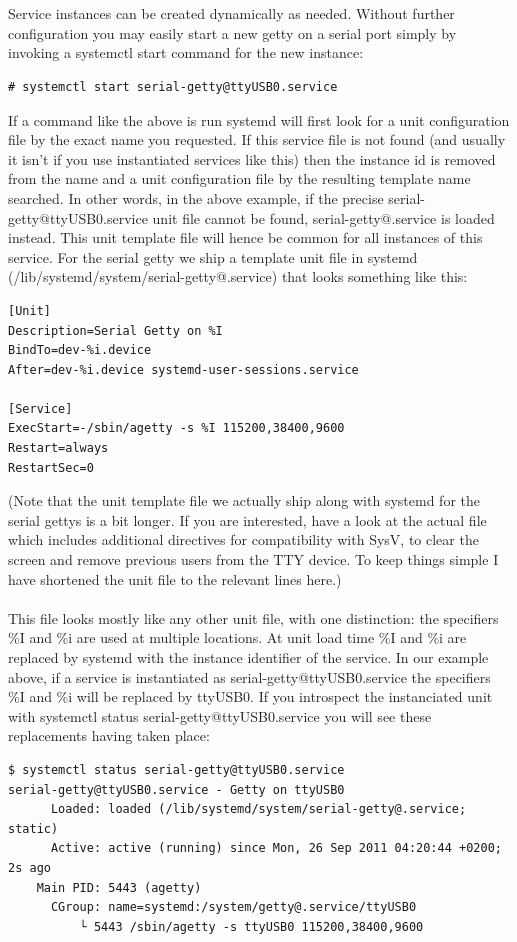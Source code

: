 \documentclass[titlepage]{article}
\begin{document}
\\
\\
Service instances can be created dynamically as needed. Without further configuration you may easily start a new getty on a serial port simply by invoking a systemctl start command for the new instance:
\begin{lstlisting}
# systemctl start serial-getty@ttyUSB0.service
\end{lstlisting}
If a command like the above is run systemd will first look for a unit configuration file by the exact name you requested. If this service file is not found (and usually it isn't if you use instantiated services like this) then the instance id is removed from the name and a unit configuration file by the resulting template name searched. In other words, in the above example, if the precise serial-getty@ttyUSB0.service unit file cannot be found, serial-getty@.service is loaded instead. This unit template file will hence be common for all instances of this service. For the serial getty we ship a template unit file in systemd (/lib/systemd/system/serial-getty@.service) that looks something like this:
\begin{lstlisting}
[Unit]
Description=Serial Getty on %I
BindTo=dev-%i.device
After=dev-%i.device systemd-user-sessions.service

[Service]
ExecStart=-/sbin/agetty -s %I 115200,38400,9600
Restart=always
RestartSec=0
\end{lstlisting}
(Note that the unit template file we actually ship along with systemd for the serial gettys is a bit longer. If you are interested, have a look at the actual file which includes additional directives for compatibility with SysV, to clear the screen and remove previous users from the TTY device. To keep things simple I have shortened the unit file to the relevant lines here.)
\\
\\
This file looks mostly like any other unit file, with one distinction: the specifiers \%I and \%i are used at multiple locations. At unit load time \%I and \%i are replaced by systemd with the instance identifier of the service. In our example above, if a service is instantiated as serial-getty@ttyUSB0.service the specifiers \%I and \%i will be replaced by ttyUSB0. If you introspect the instanciated unit with systemctl status serial-getty@ttyUSB0.service you will see these replacements having taken place:
\begin{lstlisting}
$ systemctl status serial-getty@ttyUSB0.service
serial-getty@ttyUSB0.service - Getty on ttyUSB0
      Loaded: loaded (/lib/systemd/system/serial-getty@.service; static)
      Active: active (running) since Mon, 26 Sep 2011 04:20:44 +0200; 2s ago
    Main PID: 5443 (agetty)
      CGroup: name=systemd:/system/getty@.service/ttyUSB0
          └ 5443 /sbin/agetty -s ttyUSB0 115200,38400,9600
\end{lstlisting}
\end{document}
